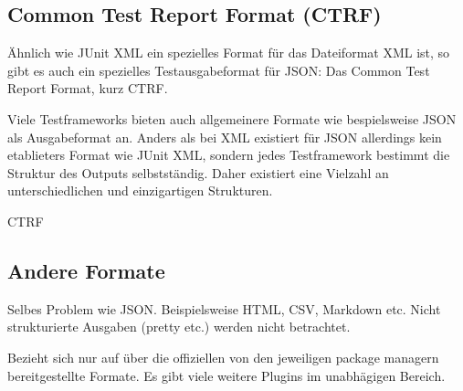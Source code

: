 
\subsection{Common Test Report Format (CTRF)}
Ähnlich wie JUnit XML ein spezielles Format für das Dateiformat XML ist, so gibt es auch ein spezielles Testausgabeformat für JSON: Das Common Test Report Format, kurz CTRF.  

Viele Testframeworks bieten auch allgemeinere Formate wie bespielsweise JSON als Ausgabeformat an. Anders als bei XML existiert für JSON allerdings kein etablieters Format wie JUnit XML, sondern jedes Testframework bestimmt die Struktur des Outputs selbstständig. Daher existiert eine Vielzahl an unterschiedlichen und einzigartigen Strukturen.

CTRF

\subsection{Andere Formate}
Selbes Problem wie JSON. Beispielsweise HTML, CSV, Markdown etc. Nicht strukturierte Ausgaben (pretty etc.) werden nicht betrachtet.

Bezieht sich nur auf über die offiziellen von den jeweiligen package managern bereitgestellte Formate. Es gibt viele weitere Plugins im unabhägigen Bereich.

